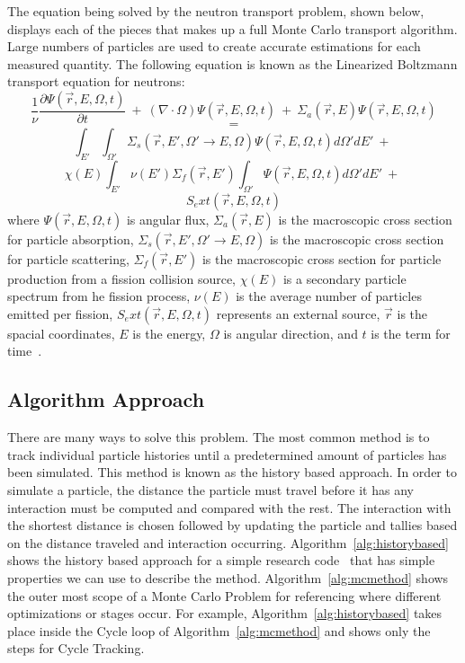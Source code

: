 %
The equation being solved by the neutron transport problem, shown below, displays each of the pieces that makes up a full Monte Carlo transport algorithm.
%
Large numbers of particles are used to create accurate estimations for each measured quantity.
%
The following equation is known as the Linearized Boltzmann transport equation for neutrons:
%
$$
\frac{1}{\nu} \frac{ \partial \Psi ( \vec{r}, E, \Omega, t ) }{\partial t}\ +\ 
(\nabla \cdot \Omega ) \Psi ( \vec{r}, E, \Omega, t )\ +\ 
\Sigma_a (\vec{r}, E ) \Psi ( \vec{r}, E, \Omega, t )
$$
$$=$$
$$
\int _{E '} \int _{\Omega '} \Sigma_{s} ( \vec{r}, E', \Omega ' \rightarrow E, \Omega ) \Psi (\vec{r}, E, \Omega, t) d \Omega ' dE'\ +\ 
$$
$$
\chi (E) \int _{E'} \nu (E') \Sigma_{f} (\vec{r},E') \int _{\Omega '} \Psi ( \vec{r}, E, \Omega, t ) d \Omega ' dE'\ +\ $$
$$
S_ext(\vec{r}, E, \Omega, t )
$$
%
where $ \Psi ( \vec{r}, E, \Omega, t ) $ is angular flux, 
$\Sigma_a (\vec{r}, E )$ is the macroscopic cross section for particle absorption, 
$\Sigma_{s} ( \vec{r}, E', \Omega ' \rightarrow E, \Omega )$ is the macroscopic cross section for particle scattering,
$\Sigma_{f} (\vec{r},E') $ is the macroscopic cross section for particle production from a fission collision source,
$\chi (E)$ is a secondary particle spectrum from he fission process,
$\nu (E)$ is the average number of particles emitted per fission,
$S_ext(\vec{r}, E, \Omega, t )$ represents an external source,
$\vec{r}$ is the spacial coordinates,
$E$ is the energy,
$\Omega$ is angular direction,
and $t$ is the term for time~\cite{gentileMCPTAPO}.
%

\subsection{ \textbf{ Algorithm Approach} }

There are many ways to solve this problem.
%
The most common method is to track individual particle histories until a predetermined amount of particles has been simulated.
%
This method is known as the history based approach.
%
In order to simulate a particle, the distance the particle must travel before it has any interaction must be computed and compared with the rest.
%
The interaction with the shortest distance is chosen followed by updating the particle and tallies based on the distance traveled and interaction occurring.
% 
Algorithm~\ref{alg:historybased} shows the history based approach for a simple research code~\cite{alpsmc1} that has simple properties we can use to describe the method.
%
Algorithm~\ref{alg:mcmethod} shows the outer most scope of a Monte Carlo Problem for referencing where different optimizations or stages occur.
%
For example, Algorithm~\ref{alg:historybased} takes place inside the Cycle loop of Algorithm~\ref{alg:mcmethod} and shows only the steps for Cycle Tracking.


